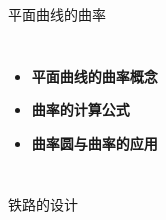 \begin{frame}
	\titlepage
\end{frame}

\begin{frame}{平面曲线的曲率}
	\linespread{1.5}
	\begin{columns}
			\vspace{-2cm}
			\begin{itemize}
		      \item {\bf 平面曲线的曲率概念}
		      \item {\bf 曲率的计算公式}
		      \item {\bf 曲率圆与曲率的应用}
		    \end{itemize}
			\vspace{2cm}
	\end{columns}
\end{frame}

\begin{frame}{铁路的设计}
	\linespread{1.2}
	\begin{center}
	\end{center}
\end{frame}

